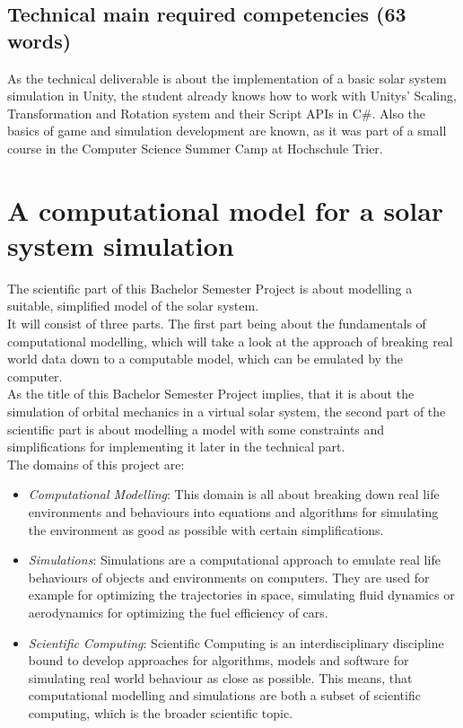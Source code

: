 \documentclass[conference,compsoc]{IEEEtran}
\begin{document}
\subsection{Technical main required competencies (63 words)}
As the technical deliverable is about the implementation of a basic solar system simulation in Unity, the student already knows how to work with Unitys' Scaling, Transformation and Rotation system and their Script APIs in C\#. Also the basics of game and simulation development are known, as it was part of a small course in the Computer Science Summer Camp at Hochschule Trier.

\section{ A computational model for a solar system simulation }
The scientific part of this Bachelor Semester Project is about modelling a suitable, simplified model of the solar system.\\
It will consist of three parts. The first part being about the fundamentals of computational modelling, which will take a look at the approach of breaking real world data down to a computable model, which can be emulated by the computer.\\
As the title of this Bachelor Semester Project implies, that it is about the simulation of orbital mechanics in a virtual solar system, the second part of the scientific part is about modelling a model with some constraints and simplifications for implementing it later in the technical part. \\ 
The domains of this project are:
\begin{itemize}
	\item \emph{Computational Modelling}: This domain is all about breaking down real life environments and behaviours into equations and algorithms for simulating the environment as good as possible with certain simplifications.
	\item \emph{Simulations}: Simulations are a computational approach to emulate real life behaviours of objects and environments on computers. They are used for example for optimizing the trajectories in space, simulating fluid dynamics or aerodynamics for optimizing the fuel efficiency of cars.
	\item \emph{Scientific Computing}: Scientific Computing is an interdisciplinary discipline bound to develop approaches for algorithms, models and software for simulating real world behaviour as close as possible. This means, that computational modelling and simulations are both a subset of scientific computing, which is the broader scientific topic. 
\end{itemize}
\end{document}

